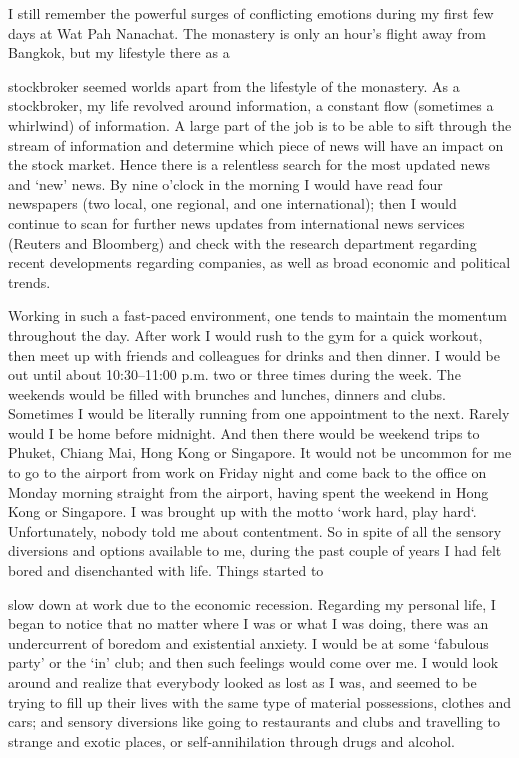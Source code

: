 I still remember the powerful surges of conflicting emotions during my
first few days at Wat Pah Nanachat. The monastery is only an hour's
flight away from Bangkok, but my lifestyle there as a

stockbroker seemed worlds apart from the lifestyle of the monastery. As
a stockbroker, my life revolved around information, a constant flow
(sometimes a whirlwind) of information. A large part of the job is to be
able to sift through the stream of information and determine which piece
of news will have an impact on the stock market. Hence there is a
relentless search for the most updated news and `new' news. By nine
o'clock in the morning I would have read four newspapers (two local, one
regional, and one international); then I would continue to scan for
further news updates from international news services (Reuters and
Bloomberg) and check with the research department regarding recent
developments regarding companies, as well as broad economic and
political trends.

Working in such a fast-paced environment, one tends to maintain the
momentum throughout the day. After work I would rush to the gym for a
quick workout, then meet up with friends and colleagues for drinks and
then dinner. I would be out until about 10:30--11:00 p.m. two or three
times during the week. The weekends would be filled with brunches and
lunches, dinners and clubs. Sometimes I would be literally running from
one appointment to the next. Rarely would I be home before midnight. And
then there would be weekend trips to Phuket, Chiang Mai, Hong Kong or
Singapore. It would not be uncommon for me to go to the airport from
work on Friday night and come back to the office on Monday morning
straight from the airport, having spent the weekend in Hong Kong or
Singapore. I was brought up with the motto `work hard, play hard`.
Unfortunately, nobody told me about contentment. So in spite of all the
sensory diversions and options available to me, during the past couple
of years I had felt bored and disenchanted with life. Things started to

slow down at work due to the economic recession. Regarding my personal
life, I began to notice that no matter where I was or what I was doing,
there was an undercurrent of boredom and existential anxiety. I would be
at some `fabulous party' or the `in' club; and then such feelings would
come over me. I would look around and realize that everybody looked as
lost as I was, and seemed to be trying to fill up their lives with the
same type of material possessions, clothes and cars; and sensory
diversions like going to restaurants and clubs and travelling to strange
and exotic places, or self-annihilation through drugs and alcohol.

